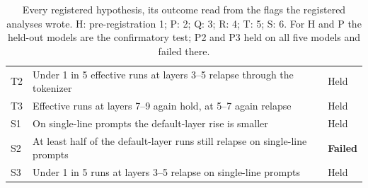 \begin{table}[!t]
\begin{tabular}{@{}l>{\raggedright\arraybackslash}p{}l@{}}
T2 & Under 1 in 5 effective runs at layers 3--5 relapse through the tokenizer & Held \\
T3 & Effective runs at layers 7--9 again hold, at 5--7 again relapse & Held \\
\addlinespace[2pt]
S1 & On single-line prompts the default-layer rise is smaller & Held \\
S2 & At least half of the default-layer runs still relapse on single-line prompts & \textbf{Failed} \\
S3 & Under 1 in 5 runs at layers 3--5 relapse on single-line prompts & Held \\
\bottomrule
\end{tabular}
\caption{Every registered hypothesis, its outcome read from the flags the registered analyses wrote. H: pre-registration 1; P: 2; Q: 3; R: 4; T: 5; S: 6. For H and P the held-out models are the confirmatory test; P2 and P3 held on all five models and failed there.}
\label{tab:hyp}
\end{table}
